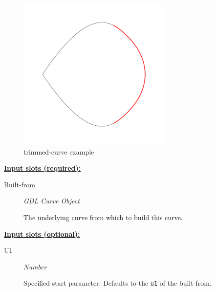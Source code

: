 \documentclass [11pt]{book}
\begin{document}
\begin{itemize}
\begin{figure}
\label{fig:example-code-trimmed-curve}

\end{figure}

\begin{figure}
\begin{center}
\includegraphics[width=3in,height=3in]{../images/example-trimmed-curve.pdf}
\end{center}

\caption{trimmed-curve example}

\label{fig:trimmed-curve}

\end{figure}





\textbf{
\underline{Input slots (required):}}

\begin{description}

\item [Built-from]
\emph{GDL Curve Object}

 The underlying curve from which to build this curve.




\end{description}






\textbf{
\underline{Input slots (optional):}}

\begin{description}

\item [U1]
\emph{Number}

 Specified start parameter. Defaults to the \texttt{u1} of the built-from.





\end{description}
\end{itemize}
\end{document}
